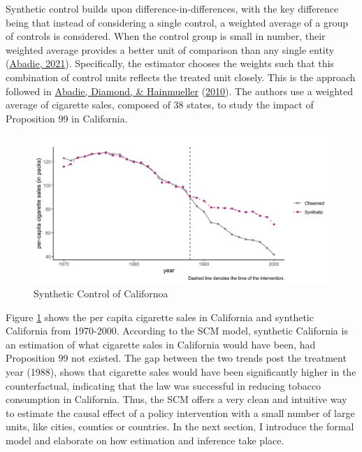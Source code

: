 \documentclass[12pt,nobind, a4paper]{reedthesis}
\begin{document}
 Synthetic control builds upon difference-in-differences, with the key difference being that instead of considering a single control, a weighted average of a group of controls is considered. When the control group is small in number, their weighted average provides a better unit of comparison than any single entity (\protect\hyperlink{ref-abadie_using_2021}{Abadie, 2021}). Specifically, the estimator chooses the weights such that this combination of control units reflects the treated unit closely. This is the approach followed in \protect\hyperlink{ref-abadie_synthetic_2010}{Abadie, Diamond, \& Hainmueller} (\protect\hyperlink{ref-abadie_synthetic_2010}{2010}). The authors use a weighted average of cigarette sales, composed of 38 states, to study the impact of Proposition 99 in California.
 \begin{figure}

 {\centering \includegraphics[width=1\linewidth]{figure/caltrends} 

 }

 \caption{Synthetic Control of Californoa}\label{fig:prop}
 \end{figure}
 Figure \ref{fig:prop} shows the per capita cigarette sales in California and synthetic California from 1970-2000. According to the SCM model, synthetic California is an estimation of what cigarette sales in California would have been, had Proposition 99 not existed. The gap between the two trends post the treatment year (1988), shows that cigarette sales would have been significantly higher in the counterfactual, indicating that the law was successful in reducing tobacco consumption in California. Thus, the SCM offers a very clean and intuitive way to estimate the causal effect of a policy intervention with a small number of large units, like cities, counties or countries. In the next section, I introduce the formal model and elaborate on how estimation and inference take place.
\end{document}
